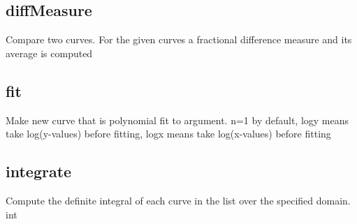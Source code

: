 \documentclass[letterpaper,10pt,english]{sphinxmanual}
\begin{document}
\begin{sphinxVerbatim}[commandchars=\\\{\}]
\PYG{p}{[}\PYG{p}{]}  
\end{sphinxVerbatim}


\subsection{diffMeasure}
\label{\detokenize{math_operations:diffmeasure}}
Compare two curves. For the given curves a fractional difference measure and its average is computed

\begin{sphinxVerbatim}[commandchars=\\\{\}]
\PYG{p}{[}\PYG{p}{]}    \PYG{p}{[}\PYG{p}{]}
\end{sphinxVerbatim}


\subsection{fit}
\label{\detokenize{math_operations:fit}}
Make new curve that is polynomial fit to argument. n=1 by default, logy means take log(y-values) before fitting, logx means take log(x-values) before fitting

\begin{sphinxVerbatim}[commandchars=\\\{\}]
\PYG{p}{[}\PYG{p}{]}   \PYG{p}{[}\PYG{p}{]} \PYG{p}{[}\PYG{p}{]} \PYG{p}{[}\PYG{p}{]}
\end{sphinxVerbatim}


\subsection{integrate}
\label{\detokenize{math_operations:integrate}}
Compute the definite integral of each curve in the list over the specified domain.  int

\begin{sphinxVerbatim}[commandchars=\\\{\}]
\PYG{p}{[}\PYG{p}{]}   \PYG{p}{[} \PYG{p}{]}
\end{sphinxVerbatim}
\end{document}
